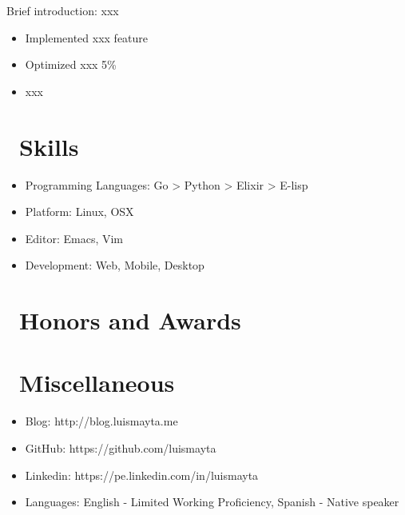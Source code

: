 \documentclass{resume}
\begin{document}
Brief introduction: xxx
\begin{itemize}
  \item Implemented xxx feature
  \item Optimized xxx 5\%
  \item xxx
\end{itemize}

\section{\faCogs\ Skills}
\begin{itemize}[parsep=0.5ex]
  \item Programming Languages: Go > Python > Elixir > E-lisp
  \item Platform: Linux, OSX
  \item Editor: Emacs, Vim
  \item Development: Web, Mobile, Desktop
\end{itemize}

\section{\faHeartO\ Honors and Awards}

\section{\faInfo\ Miscellaneous}
\begin{itemize}[parsep=0.5ex]
  \item Blog: http://blog.luismayta.me
  \item GitHub: https://github.com/luismayta
  \item Linkedin: https://pe.linkedin.com/in/luismayta
  \item Languages: English - Limited Working Proficiency, Spanish - Native speaker
\end{itemize}

%
%
\end{document}
